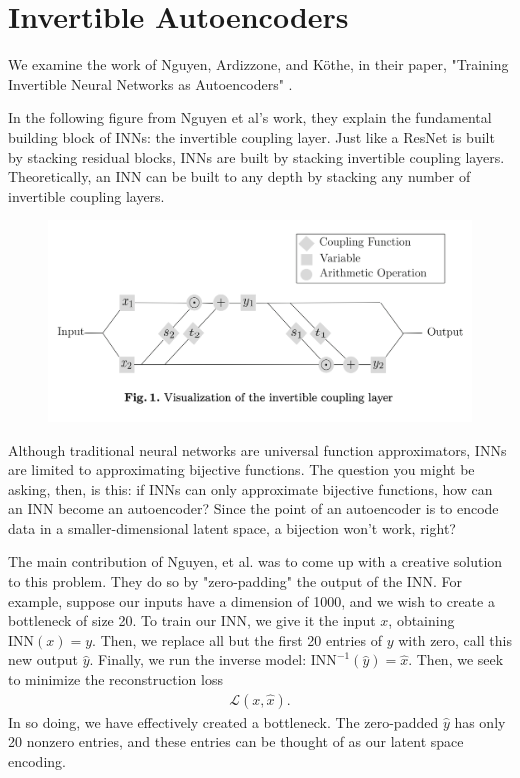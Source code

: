 \documentclass[12pt,letterpaper]{article}
\begin{document}
\section{Invertible Autoencoders}
We examine the work of Nguyen, Ardizzone, and K\"{o}the, in their paper, "Training Invertible Neural Networks as Autoencoders" \cite{Nguyen2019}.

In the following figure from Nguyen et al's work, they explain the fundamental building block of INNs: the invertible coupling layer.
Just like a ResNet is built by stacking residual blocks, INNs are built by stacking invertible coupling layers.
Theoretically, an INN can be built to any depth by stacking any number of invertible coupling layers.

\begin{figure}[!htb]
\begin{center}
   \includegraphics[width=0.9\linewidth]{./pics/invertible_coupling_layer.png}
\end{center}
\end{figure}

Although traditional neural networks are universal function approximators, INNs are limited to approximating bijective functions.
The question you might be asking, then, is this: if INNs can only approximate bijective functions, how can an INN become an autoencoder?
Since the point of an autoencoder is to encode data in a smaller-dimensional latent space, a bijection won't work, right?

The main contribution of Nguyen, et al. was to come up with a creative solution to this problem.
They do so by "zero-padding" the output of the INN.
For example, suppose our inputs have a dimension of 1000, and we wish to create a bottleneck of size 20.
To train our INN, we give it the input $ x $, obtaining $ \text{INN}(x) = y $.
Then, we replace all but the first 20 entries of $ y $ with zero, call this new output $ \hat{y} $.
Finally, we run the inverse model: $\text{INN}^{-1}(\hat{y}) = \hat{x}$.
Then, we seek to minimize the reconstruction loss \begin{align*}
    \mathscr{L}(x, \hat{x}).
\end{align*}
In so doing, we have effectively created a bottleneck.
The zero-padded $ \hat{y} $ has only 20 nonzero entries, and these entries can be thought of as our latent space encoding.
\end{document}
